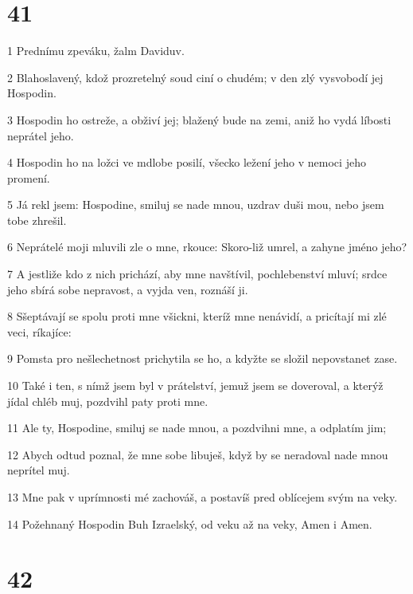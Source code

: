 \chapter{41}

\par 1 Prednímu zpeváku, žalm Daviduv.
\par 2 Blahoslavený, kdož prozretelný soud ciní o chudém; v den zlý vysvobodí jej Hospodin.
\par 3 Hospodin ho ostreže, a obživí jej; blažený bude na zemi, aniž ho vydá líbosti neprátel jeho.
\par 4 Hospodin ho na ložci ve mdlobe posilí, všecko ležení jeho v nemoci jeho promení.
\par 5 Já rekl jsem: Hospodine, smiluj se nade mnou, uzdrav duši mou, nebo jsem tobe zhrešil.
\par 6 Neprátelé moji mluvili zle o mne, rkouce: Skoro-liž umrel, a zahyne jméno jeho?
\par 7 A jestliže kdo z nich prichází, aby mne navštívil, pochlebenství mluví; srdce jeho sbírá sobe nepravost, a vyjda ven, roznáší ji.
\par 8 Sšeptávají se spolu proti mne všickni, kteríž mne nenávidí, a pricítají mi zlé veci, ríkajíce:
\par 9 Pomsta pro nešlechetnost prichytila se ho, a kdyžte se složil nepovstanet zase.
\par 10 Také i ten, s nímž jsem byl v prátelství, jemuž jsem se doveroval, a kterýž jídal chléb muj, pozdvihl paty proti mne.
\par 11 Ale ty, Hospodine, smiluj se nade mnou, a pozdvihni mne, a odplatím jim;
\par 12 Abych odtud poznal, že mne sobe libuješ, když by se neradoval nade mnou neprítel muj.
\par 13 Mne pak v uprímnosti mé zachováš, a postavíš pred oblícejem svým na veky.
\par 14 Požehnaný Hospodin Buh Izraelský, od veku až na veky, Amen i Amen.

\chapter{42}

